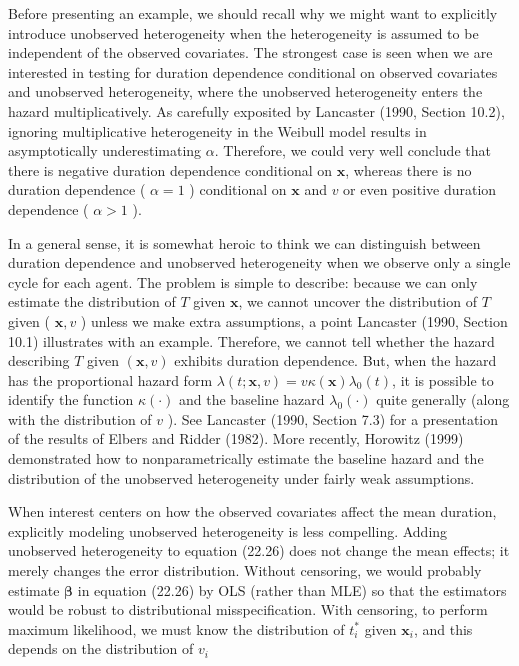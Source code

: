 \documentclass[10pt]{article}
\begin{document}
Before presenting an example, we should recall why we might want to explicitly introduce unobserved heterogeneity when the heterogeneity is assumed to be independent of the observed covariates. The strongest case is seen when we are interested in testing for duration dependence conditional on observed covariates and unobserved heterogeneity, where the unobserved heterogeneity enters the hazard multiplicatively. As carefully exposited by Lancaster (1990, Section 10.2), ignoring multiplicative heterogeneity in the Weibull model results in asymptotically underestimating $\alpha$. Therefore, we could very well conclude that there is negative duration dependence conditional on $\mathbf{x}$, whereas there is no duration dependence ( $\alpha=1$ ) conditional on $\mathbf{x}$ and $v$ or even positive duration dependence ( $\alpha>1$ ).

In a general sense, it is somewhat heroic to think we can distinguish between duration dependence and unobserved heterogeneity when we observe only a single cycle for each agent. The problem is simple to describe: because we can only estimate the distribution of $T$ given $\mathbf{x}$, we cannot uncover the distribution of $T$ given ( $\mathbf{x}, v$ ) unless we make extra assumptions, a point Lancaster (1990, Section 10.1) illustrates with an example. Therefore, we cannot tell whether the hazard describing $T$ given $(\mathbf{x}, v)$ exhibits duration dependence. But, when the hazard has the proportional hazard form $\lambda(t ; \mathbf{x}, v)=v \kappa(\mathbf{x}) \lambda_{0}(t)$, it is possible to identify the function $\kappa(\cdot)$ and the baseline hazard $\lambda_{0}(\cdot)$ quite generally (along with the distribution of $v$ ). See Lancaster (1990, Section 7.3) for a presentation of the results of Elbers and Ridder (1982). More recently, Horowitz (1999) demonstrated how to nonparametrically estimate the baseline hazard and the distribution of the unobserved heterogeneity under fairly weak assumptions.

When interest centers on how the observed covariates affect the mean duration, explicitly modeling unobserved heterogeneity is less compelling. Adding unobserved heterogeneity to equation (22.26) does not change the mean effects; it merely changes the error distribution. Without censoring, we would probably estimate $\boldsymbol{\beta}$ in equation (22.26) by OLS (rather than MLE) so that the estimators would be robust to distributional misspecification. With censoring, to perform maximum likelihood, we must know the distribution of $t_{i}^{*}$ given $\mathbf{x}_{i}$, and this depends on the distribution of $v_{i}$
\end{document}
